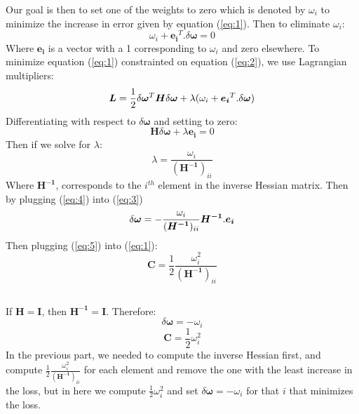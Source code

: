 \documentclass[11pt]{scrartcl} %
\begin{document}
		Our goal is then to set one of the weights to 
		zero which is denoted by $\omega_i$ to minimize the increase in error given by equation (\ref{eq:1}). 
		Then to eliminate $\omega_i$:
		\begin{equation}\label{eq:2}
			\omega_i + \boldsymbol{e_i}^T.\delta\boldsymbol\omega = 0
		\end{equation}
		Where $\boldsymbol{e_i}$ is a vector with a 1 corresponding to $\omega_i$ and zero elsewhere.
		To minimize equation (\ref{eq:1}) constrainted on equation (\ref{eq:2}), we use Lagrangian multipliers:
		\begin{equation}
			\boldsymbol{L} = \frac{1}{2}\delta\boldsymbol{\omega}^T\boldsymbol{H}\delta\boldsymbol{\omega} \\
			+ \lambda(\omega_i + \boldsymbol{e_i}^T.\delta\boldsymbol\omega)
		\end{equation}
		Differentiating with respect to $\delta\boldsymbol\omega$ and setting to zero:
		\begin{equation} \label{eq:3}
			\boldsymbol{H}\delta\boldsymbol{\omega} + \lambda \boldsymbol{e_i}=0
		\end{equation}
		Then if we solve for $\lambda$:
		\begin{equation}\label{eq:4}
			\lambda = \frac{\omega_i}{(\boldsymbol{H^{-1}})_{ii}}
		\end{equation}
		Where $\boldsymbol{H^{-1}}$, corresponds to the $i^{th}$ element in the inverse Hessian matrix.
		Then by plugging (\ref{eq:4}) into (\ref{eq:3})
		\begin{equation} \label{eq:5}
			\delta\boldsymbol{\omega} = -\frac{\omega_i}{(\boldsymbol{H^{-1}})_{ii}}\\
			 \boldsymbol{H^{-1}}.\boldsymbol{e_i}
		\end{equation}
		Then plugging (\ref{eq:5}) into (\ref{eq:1}):
		\begin{equation}
			\boldsymbol{C} = \frac{1}{2} \frac{\omega_i^2}{(\boldsymbol{H^{-1}})_{ii}}
		\end{equation}

	\subsection{}
		If $ \boldsymbol{H} = \boldsymbol{I} $, then $ \boldsymbol{H^{-1}} = \boldsymbol{I} $. Therefore:
		\begin{equation}
			\delta\boldsymbol{\omega} = -\omega_i
		\end{equation}
		\begin{equation}
			\boldsymbol{C} = \frac{1}{2} \omega_i^2
		\end{equation}
		In the previous part, we needed to compute the inverse Hessian first, and compute 
		$\frac{1}{2} \frac{\omega_i^2}{(\boldsymbol{H^{-1}})_{ii}}$ for each element and remove 
		the one with the
		least increase in the loss, but in here we compute $\frac{1}{2} \omega_i^2$ 
		and set $\delta\boldsymbol{\omega} = -\omega_i$
		for that $i$ that minimizes the loss.
\end{document}
